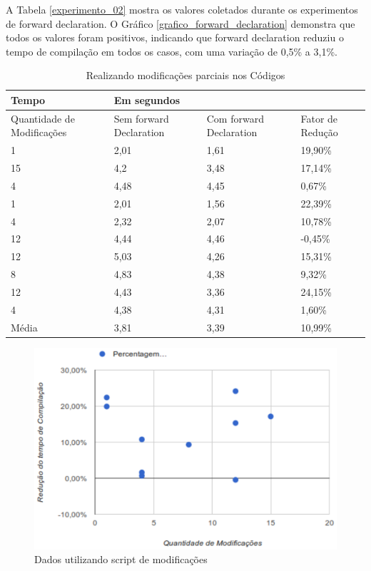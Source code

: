 A Tabela \ref{experimento_02} mostra os valores coletados durante
 os experimentos de forward declaration. O Gráfico
 \ref{grafico_forward_declaration} demonstra que todos os valores
 foram positivos, indicando que forward declaration reduziu o tempo
 de compilação em todos os casos, com uma variação de 0,5\% a 3,1\%.





\begin{table}[h]
\centering
\begin{tabular}{|p{3cm}|p{3cm}|p{3cm}|p{3cm}|}
\hline
Tempo      & \multicolumn{3}{l|}{Em segundos}    \\ \hline
Quantidade de Modificações & Sem forward Declaration  & Com forward Declaration & Fator de Redução\\ \hline
1  & 2,01 & 1,61 & 19,90\% \\ \hline
15 & 4,2  & 3,48 & 17,14\% \\ \hline
4  & 4,48 & 4,45 & 0,67\% \\ \hline
1  & 2,01 & 1,56 & 22,39\% \\ \hline
4  & 2,32 & 2,07 & 10,78\% \\ \hline
12 & 4,44 & 4,46 & -0,45\% \\ \hline
12 & 5,03 & 4,26 & 15,31\% \\ \hline
8  & 4,83 & 4,38 & 9,32\% \\ \hline
12 & 4,43 & 3,36 & 24,15\% \\ \hline
4  & 4,38 & 4,31 & 1,60\% \\ \hline
Média  & 3,81  & 3,39  & 10,99\% \\ \hline 
\end{tabular}
\caption{Realizando modificações parciais nos Códigos}
\label{experimento_03}
\end{table}


\begin{figure}[h]
    \centering
        \includegraphics[keepaspectratio=true,scale=1]{figuras/forward_declaration2.eps}
    \caption{Dados utilizando script de modificações}
    \label{grafico_forward_declaration2}
\end{figure}

